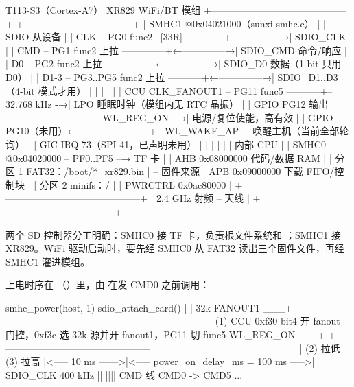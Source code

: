 \begin{txtcode}[basicstyle=\ttfamily\scriptsize]
              T113-S3（Cortex-A7）                                    XR829 WiFi/BT 模组
+------------------------------------------+                +----------------------------------+
| SMHC1  @0x04021000（sunxi-smhc.c）        |                | SDIO 从设备                       |
|   CLK  -- PG0  func2 --[33R]-------------+---------------→| SDIO_CLK                          |
|   CMD  -- PG1  func2  上拉 --------------+←--------------→| SDIO_CMD    命令/响应              |
|   D0   -- PG2  func2  上拉 --------------+←--------------→| SDIO_D0     数据（1-bit 只用 D0）   |
|   D1-3 -- PG3..PG5 func2 上拉 -----------+←--------------→| SDIO_D1..D3（4-bit 模式才用）       |
|                                          |                |                                  |
| CCU CLK_FANOUT1 -- PG11 func5 -----------+-- 32.768 kHz -→| LPO 睡眠时钟（模组内无 RTC 晶振）   |
| GPIO PG12 输出 --------------------------+-- WL_REG_ON --→| 电源/复位使能，高有效              |
| GPIO PG10（未用）←-----------------------+-- WL_WAKE_AP --| 唤醒主机（当前全部轮询）            |
| GIC IRQ 73（SPI 41，已声明未用）          |                |                                  |
|                                          |                | 内部 CPU                         |
| SMHC0  @0x04020000 -- PF0..PF5 --→ TF 卡  |                |   AHB 0x08000000  代码/数据 RAM    |
|   分区 1 FAT32：/boot/*_xr829.bin        | -- 固件来源     |   APB 0x09000000  下载 FIFO/控制块 |
|   分区 2 minifs：/                       |                |   PWRCTRL 0x0ac80000              |
+------------------------------------------+                | 2.4 GHz 射频 -- 天线               |
                                                            +----------------------------------+
\end{txtcode}

两个 SD 控制器分工明确：SMHC0 接 TF 卡，负责根文件系统和 ；SMHC1 接 XR829。WiFi 驱动启动时，要先经 SMHC0 从 FAT32 读出三个固件文件，再经 SMHC1 灌进模组。

上电时序在 （）里，由  在发 CMD0 之前调用：

\begin{txtcode}[basicstyle=\ttfamily\scriptsize]
                smhc_power(host, 1)                              sdio_attach_card()
                |                                                |
32k FANOUT1  ___+-----------------------------------------------------------------
                 (1) CCU 0xf30 bit4 开 fanout 门控，0xf3c 选 32k 源并开 fanout1，PG11 切 func5
WL_REG_ON    ------+                    +---------------------------------------------
                   |____________________|
                   (2) 拉低             (3) 拉高
                   |<----- 10 ms ------>|<----- power_on_delay_ms = 100 ms ----->|
SDIO_CLK                                                                 400 kHz |||||||
CMD 线                                                                   CMD0 -> CMD5 ...
\end{txtcode}

